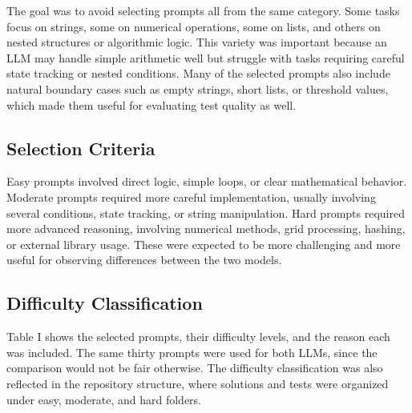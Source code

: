 \documentclass[journal]{IEEEtran}
\begin{document}
The goal was to avoid selecting prompts all from the same category. Some tasks focus on strings, some on numerical operations, some on lists, and others on nested structures or algorithmic logic. This variety was important because an LLM may handle simple arithmetic well but struggle with tasks requiring careful state tracking or nested conditions. Many of the selected prompts also include natural boundary cases such as empty strings, short lists, or threshold values, which made them useful for evaluating test quality as well.

\subsection{Selection Criteria}
Easy prompts involved direct logic, simple loops, or clear mathematical behavior. Moderate prompts required more careful implementation, usually involving several conditions, state tracking, or string manipulation. Hard prompts required more advanced reasoning, involving numerical methods, grid processing, hashing, or external library usage. These were expected to be more challenging and more useful for observing differences between the two models.

\subsection{Difficulty Classification}
Table I shows the selected prompts, their difficulty levels, and the reason each was included. The same thirty prompts were used for both LLMs, since the comparison would not be fair otherwise. The difficulty classification was also reflected in the repository structure, where solutions and tests were organized under easy, moderate, and hard folders.
\end{document}
